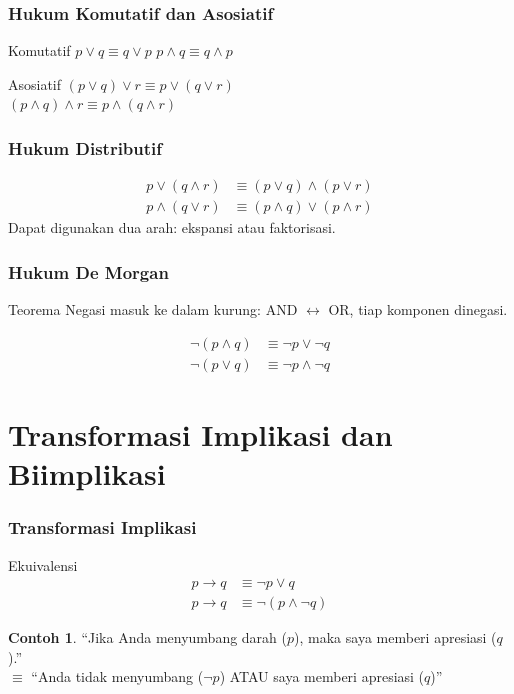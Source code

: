 \documentclass[handout]{beamer}
\theoremstyle{definition}
\theoremstyle{example}
\newtheorem{contoh}[theorem]{Contoh}
\begin{document}
\begin{frame}
\frametitle{Hukum Komutatif dan Asosiatif}
\begin{block}{Komutatif}
$p \vee q \equiv q \vee p$ \quad $p \wedge q \equiv q \wedge p$
\end{block}
\begin{block}{Asosiatif}
$(p \vee q) \vee r \equiv p \vee (q \vee r)$\\
$(p \wedge q) \wedge r \equiv p \wedge (q \wedge r)$
\end{block}
\end{frame}

\begin{frame}
\frametitle{Hukum Distributif}
\begin{align*}
p \vee (q \wedge r) &\equiv (p \vee q) \wedge (p \vee r) \\
p \wedge (q \vee r) &\equiv (p \wedge q) \vee (p \wedge r)
\end{align*}
Dapat digunakan dua arah: ekspansi atau faktorisasi.
\end{frame}

\begin{frame}
\frametitle{Hukum De Morgan}
\begin{block}{Teorema}
Negasi masuk ke dalam kurung: AND $\leftrightarrow$ OR, tiap komponen dinegasi.
\end{block}
\begin{align*}
\neg(p \wedge q) &\equiv \neg p \vee \neg q \\
\neg(p \vee q) &\equiv \neg p \wedge \neg q
\end{align*}
\end{frame}

\section{Transformasi Implikasi dan Biimplikasi}

\begin{frame}
\frametitle{Transformasi Implikasi}
\begin{block}{Ekuivalensi}
\begin{align*}
p \rightarrow q &\equiv \neg p \vee q \\
p \rightarrow q &\equiv \neg(p \wedge \neg q)
\end{align*}
\end{block}
\begin{contoh}
``Jika Anda menyumbang darah ($p$), maka saya memberi apresiasi ($q$).''\\
$\equiv$ ``Anda tidak menyumbang ($\neg p$) ATAU saya memberi apresiasi ($q$)''
\end{contoh}
\end{frame}
\end{document}
